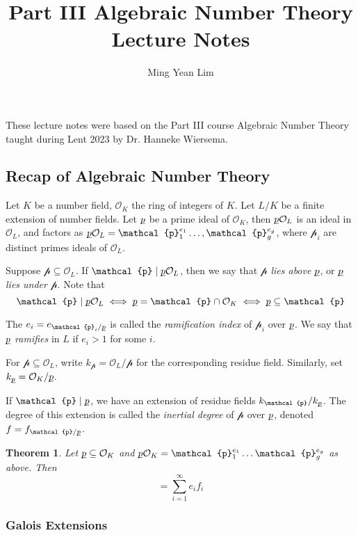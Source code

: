 \documentclass[11pt]{article}
\title{Part III Algebraic Number Theory Lecture Notes}
\author{Ming Yean Lim}
\theoremstyle{definition}
\theoremstyle{plain}
\newtheorem{theorem}[definition]{Theorem}
\theoremstyle{remark}
\newcommand{\cO}{\mathcal{O}}
\newcommand{\cp}{\mathcal{p}}
\newcommand{\up}{{\underline{\smash{p}}}}
\begin{document}
\maketitle

\noindent These lecture notes were based on the Part III course Algebraic Number Theory taught during Lent 2023 by Dr. Hanneke Wiersema.




\subsection{Recap of Algebraic Number Theory}

Let $K$ be a number field, $\cO_K$ the ring of integers of $K$. Let $L/K$ be a finite extension of number fields. Let $\up$ be a prime ideal of $\cO_K$, then $\up \cO_L$ is an ideal in $\cO_L$, and factors as $\up \cO_L = \cp_1^{e_1} \ldots, \cp_g^{e_g}$, where $\cp_i$ are distinct primes ideals of $\cO_L$.

Suppose $\cp \subseteq \cO_L$. If $\cp \mid \up \cO_L$, then we say that $\cp$ \emph{lies above} $\up$, or $\up$ \emph{lies under} $\cp$. Note that
\begin{equation*}
    \cp \mid \up \cO_L \iff \up = \cp \cap \cO_K \iff \up \subseteq \cp
\end{equation*}

The $e_i = e_{\cp_i / \up}$ is called the \emph{ramification index} of $\cp_i$ over $\up$. We say that $\up$ \emph{ramifies} in $L$ if $e_i > 1$ for some $i$.

For $\cp \subseteq \cO_L$, write $k_\cp = \cO_L / \cp$ for the corresponding residue field. Similarly, set $k_\up = \cO_K / \up$.

If $\cp \mid \up$, we have an extension of residue fields $k_\cp / k_\up$. The degree of this extension is called the \emph{inertial degree} of $\cp$ over $\up$, denoted $f = f_{\cp / \up}$.

\begin{theorem}\label{thm:1_1}
    Let $\up \subseteq \cO_K$ and $\up \cO_K = \cp_1^{e_1} \ldots \cp_g^{e_g}$ as above. Then
    \begin{equation*}
        [L : K] = \sum_{i=1}^{\infty} e_i f_i
    \end{equation*}
\end{theorem}

\subsubsection*{Galois Extensions}
\end{document}

